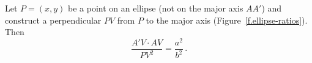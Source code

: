 %
%
%
%
%
%
%
%
%
%


\begin{theorem}\label{thm.ratios}
Let $P=(x,y)$ be a point on an ellipse (not on the major axis $AA'$) and construct a perpendicular $PV$ from $P$ to the major axis (Figure~\ref{f.ellipse-ratios}). Then
\[
\frac{A'V\cdot AV}{PV^2} = \frac{a^2}{b^2}\,.
\]
\end{theorem}

